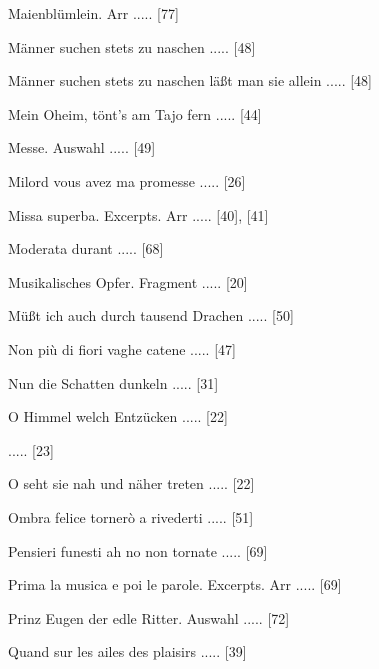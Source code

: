 \documentclass[a4paper, twocolumn, 11pt]{book}
\begin{document}
\newline 
Maienblümlein. Arr ..... [77]

\newline 
Männer suchen stets zu naschen ..... [48]

\newline 
Männer suchen stets zu naschen läßt man sie allein ..... [48]

\newline 
Mein Oheim, tönt’s am Tajo fern ..... [44]

\newline 
Messe. Auswahl ..... [49]

\newline 
Milord vous avez ma promesse ..... [26]

\newline 
Missa superba. Excerpts. Arr ..... [40], [41]

\newline 
Moderata durant ..... [68]

\newline 
Musikalisches Opfer. Fragment ..... [20]

\newline 
Müßt ich auch durch tausend Drachen ..... [50]

\newline 
Non più di fiori vaghe catene ..... [47]

\newline 
Nun die Schatten dunkeln ..... [31]

\newline 
O Himmel welch Entzücken ..... [22]

 ..... [23]

\newline 
O seht sie nah und näher treten ..... [22]

\newline 
Ombra felice tornerò a rivederti ..... [51]

\newline 
Pensieri funesti ah no non tornate ..... [69]

\newline 
Prima la musica e poi le parole. Excerpts. Arr ..... [69]

\newline 
Prinz Eugen der edle Ritter. Auswahl ..... [72]

\newline 
Quand sur les ailes des plaisirs ..... [39]
\end{document}
